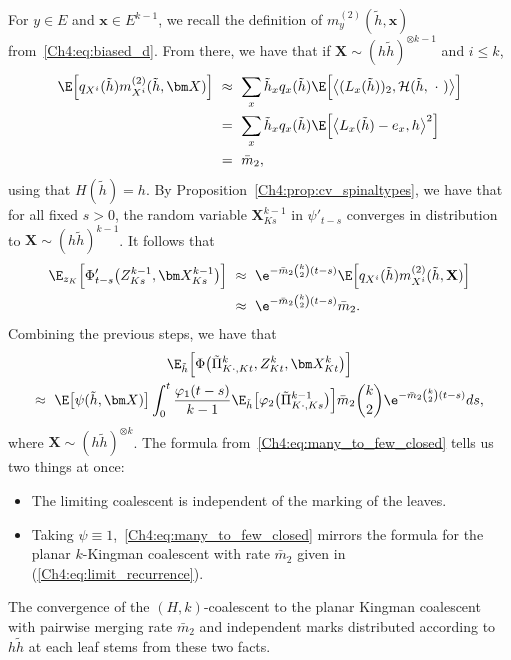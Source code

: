 \begin{refsegment}
For $y\in E$ and $\bm x\in E^{k-1}$, we recall the definition of $m^{(2)}_y(\tilde h,\bm x)$ from~\eqref{Ch4:eq:biased_d}.
From there, we have that if $\bm X\sim (h\tilde h)^{\otimes k-1}$ and $i\leq k$,
\begin{align*}
\E\Big[q_{X^i}(\tilde h)m^{(2)}_{X^i}(\tilde h, \bm X)\Big]\ &\approx\ \sum_{x}\tilde h_x q_{x}(\tilde h)\E\Big[\big\langle (L_x(\tilde h))_2, \mathcal{H}(\tilde h,\ \cdot\ )\big\rangle\Big]\\
& =\  \sum_{x}\tilde h_x q_{x}(\tilde h)\E\Big[\big\langle L_x(\tilde h)- e_x, h\big\rangle^2\Big] \\
& =\ \bar{m}_2,
\end{align*}
using that $H(\tilde h)= h$.
By Proposition~\ref{Ch4:prop:cv_spinaltypes}, we have that for all fixed $s>0$, the random variable $\bm X^{k-1}_{Ks}$ in $\psi'_{t-s}$ converges in distribution to $ \bm X\sim (h\tilde h)^{k-1}$. 
It follows that
\begin{align*}
\E_{z_K}\Big[\Phi'_{t-s}\big( Z^{k-1}_{Ks}, \bm X^{k-1}_{Ks}\big)\Big] 
\ & \approx\ 
\e^{- \bar{m}_2 \binom{k}{2}(t-s)}
\E\Big[ q_{X^i}(\tilde h) m^{(2)}_{X^i}(\tilde h,{\bf X})\Big] \\ 
 & \approx\  \e^{- \bar{m}_2 \binom{k}{2}(t-s)}
\bar m_2.  
\end{align*}
Combining the previous steps, we have that
\begin{multline}\label{Ch4:eq:many_to_few_closed}
\E_{\tilde h}\Big[\Phi\big(\tilde\Pi^k_{K\cdot, Kt}, Z^k_{Kt}, \bm X^k_{Kt}\big)\Big]\\ \approx \ \E\big[\psi(\tilde h, \bm X)\big]\int_{0}^{t}\frac{\varphi_1(t-s)}{k-1}\E_{\tilde h}\big[\varphi_2\big(\tilde\Pi^{k-1}_{K\cdot, Ks}\big)\Big] \bar{m}_2 \binom{k}{2}\e^{- \bar{m}_2 \binom{k}{2}(t-s)} ds,
\end{multline}
where $\bm X\sim (h\tilde h)^{\otimes k}$.
The formula from~\eqref{Ch4:eq:many_to_few_closed} tells us two things at once:
\begin{itemize}
  \item The limiting coalescent is independent of the marking of the leaves.
  \item Taking $\psi\equiv 1$,~\eqref{Ch4:eq:many_to_few_closed} mirrors the formula for the planar $k$-Kingman coalescent with rate $\bar m_2$ given in (\ref{Ch4:eq:limit_recurrence}).
\end{itemize} 
The convergence of the $(H,k)$-coalescent to the planar Kingman coalescent with pairwise merging rate $\bar m_2$ and independent marks distributed according to $h \tilde h$ at each leaf stems from these two facts.




\end{refsegment}
